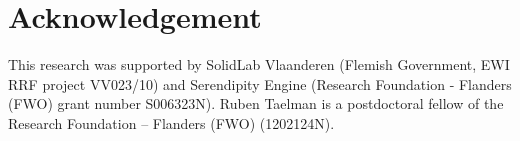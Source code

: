 \documentclass[Afour,sageh,times]{sagej}
\begin{document}
\section{Acknowledgement}

This research was supported by SolidLab Vlaanderen (Flemish Government, EWI RRF project VV023/10) and Serendipity Engine (Research Foundation - Flanders (FWO) grant number S006323N).
Ruben Taelman is a postdoctoral fellow of the Research Foundation – Flanders (FWO) (1202124N).

\printbibliography
{}


\end{document}
